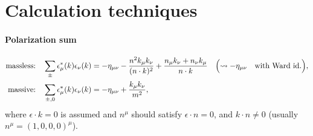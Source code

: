 \documentclass[CheatSheet]{subfiles}
\begin{document}
\summarystyle



\section{Calculation techniques}
\paragraph{Polarization sum}
\begin{alignat}{2}
\text{massless:}\quad
\sum_{\pm}\epsilon^*_\mu(k) \epsilon_\nu(k)
&=
-\eta_{\mu\nu} - \frac{n^2 k_\mu k_\nu}{(n\cdot k)^2} + \frac{n_\mu k_\nu + n_\nu k_\mu}{n\cdot k}
\quad\Bigl(\leadsto -\eta_{\mu\nu}\quad\text{with Ward id.}\Bigr),
\\
\text{massive:}\quad
\sum_{\pm,0}\epsilon^*_\mu(k) \epsilon_\nu(k)
&=
-\eta_{\mu\nu}+\frac{k_\mu k_\nu}{m^2},
\end{alignat}
where $\epsilon\cdot k = 0$ is assumed and $n^\mu$ should satisfy $\epsilon\cdot n=0$, and $k\cdot n\neq 0$ (usually $n^\mu=(1,0,0,0)^\mu$).

\clearpage
\detailstyle
\end{document}
